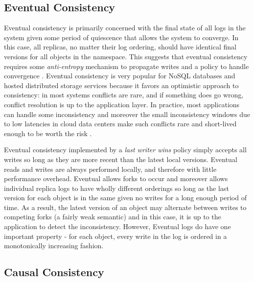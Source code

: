 \documentclass[10pt,conference,compsocconf,letterpaper]{IEEEtran}
\begin{document}
\subsection{Eventual Consistency}

Eventual consistency is primarily concerned with the final state of all logs in the system given some period of quiescence that allows the system to converge. In this case, all replicas, no matter their log ordering, should have identical final versions for all objects in the namespace. This suggests that eventual consistency requires some \textit{anti-entropy} mechanism to propagate writes and a policy to handle convergence \cite{terry_managing_1995}. Eventual consistency is very popular for NoSQL databases and hosted distributed storage services \cite{decandia_dynamo:_2007,lakshman_cassandra:_2010} because it favors an optimistic approach to consistency: in most systems conflicts are rare, and if something does go wrong, conflict resolution is up to the application layer. In practice, most applications can handle some inconsistency and moreover the small inconsistency windows due to low latencies in cloud data centers make such conflicts rare and short-lived enough to be worth the risk \cite{bailis_quantifying_2014}.

Eventual consistency implemented by a \textit{last writer wins} policy simply accepts all writes so long as they are more recent than the latest local versions. Eventual reads and writes are always performed locally, and therefore with little performance overhead. Eventual allows forks to occur and moreover allows individual replica logs to have wholly different orderings so long as the last version for each object is in the same given no writes for a long enough period of time. As a result, the latest version of an object may alternate between writes to competing forks (a fairly weak semantic) and in this case, it is up to the application to detect the inconsistency. However, Eventual logs do have one important property - for each object, every write in the log is ordered in a monotonically increasing fashion.

\subsection{Causal Consistency}
\end{document}
